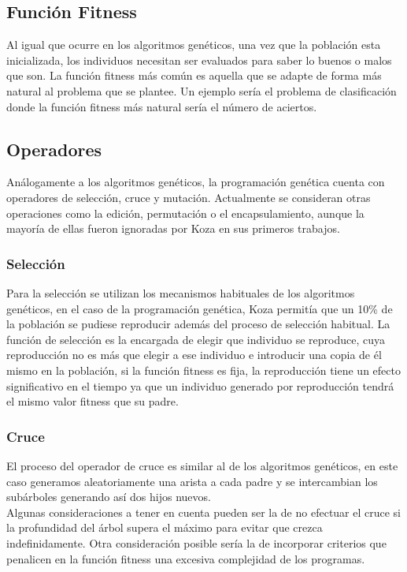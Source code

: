 \documentclass[12pt]{article} \usepackage[utf8]{inputenc}
\begin{document}
\subsection{Función Fitness}

Al igual que ocurre en los algoritmos genéticos, una vez que la
población esta inicializada, los individuos necesitan ser evaluados
para saber lo buenos o malos que son. La función fitness más
común es aquella que se adapte de forma más natural al problema que se
plantee. Un ejemplo sería el problema de clasificación donde la
función fitness más natural sería el número de aciertos.

\subsection{Operadores}

Análogamente a los algoritmos genéticos, la programación genética
cuenta con operadores de selección, cruce y mutación. Actualmente se
consideran otras operaciones como la edición, permutación o el
encapsulamiento, aunque la mayoría de ellas fueron ignoradas por Koza
en sus primeros trabajos.

\subsubsection{Selección}

Para la selección se utilizan los mecanismos habituales de los
algoritmos genéticos, en el caso de la programación genética, Koza
permitía que un 10\% de la población se pudiese reproducir además del
proceso de selección habitual. La función de selección es la encargada
de elegir que individuo se reproduce, cuya reproducción no es más que
elegir a ese individuo e introducir una copia de él mismo en la
población, si la función fitness es fija, la reproducción tiene un
efecto significativo en el tiempo ya que un individuo generado por
reproducción tendrá el mismo valor fitness que su padre.

\subsubsection{Cruce}

El proceso del operador de cruce es similar al de los algoritmos genéticos,
en este caso generamos aleatoriamente una arista a cada padre y se
intercambian los subárboles generando así dos hijos nuevos.\\

Algunas consideraciones a tener en cuenta pueden ser la de no efectuar
el cruce si la profundidad del árbol supera el máximo para evitar que
crezca indefinidamente. Otra consideración posible sería la de
incorporar criterios que penalicen en la función fitness una excesiva
complejidad de los programas.
\end{document}
